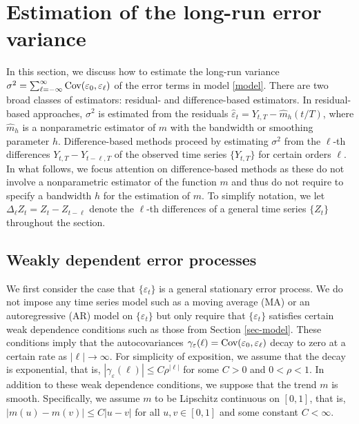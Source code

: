 \section{Estimation of the long-run error variance}\label{sec-error-var}


In this section, we discuss how to estimate the long-run variance $\sigma^2 = \sum\nolimits_{\ell=-\infty}^{\infty} \textnormal{Cov}(\varepsilon_0,\varepsilon_{\ell})$ of the error terms in model \eqref{model}. There are two broad classes of estimators: residual- and difference-based estimators. In residual-based approaches, $\sigma^2$ is estimated from the residuals $\widehat{\varepsilon}_t = Y_{t,T} - \widehat{m}_h(t/T)$, where $\widehat{m}_h$ is a nonparametric estimator of $m$ with the bandwidth or smoothing parameter $h$. Difference-based methods proceed by estimating $\sigma^2$ from the $\ell$-th differences $Y_{t,T} - Y_{t-\ell,T}$ of the observed time series $\{Y_{t,T}\}$ for certain orders $\ell$. In what follows, we focus attention on difference-based methods as these do not involve a nonparametric estimator of the function $m$ and thus do not require to specify a bandwidth $h$ for the estimation of $m$. To simplify notation, we let $\Delta_\ell Z_t = Z_t - Z_{t-\ell}$ denote the $\ell$-th differences of a general time series $\{Z_t\}$ throughout the section. 


\subsection{Weakly dependent error processes}


We first consider the case that $\{ \varepsilon_t \}$ is a general stationary error process. We do not impose any time series model such as a moving average (MA) or an autoregressive (AR) model on $\{\varepsilon_t\}$ but only require that $\{\varepsilon_t\}$ satisfies certain weak dependence conditions such as those from Section \ref{sec-model}. These conditions imply that the autocovariances $\gamma_\varepsilon(\ell) = \textnormal{Cov}(\varepsilon_0,\varepsilon_{\ell})$ decay to zero at a certain rate as $|\ell| \rightarrow \infty$. For simplicity of exposition, we assume that the decay is exponential, that is, $|\gamma_\varepsilon(\ell)| \le C \rho^{|\ell|}$ for some $C > 0$ and $0 < \rho < 1$. In addition to these weak dependence conditions, we suppose that the trend $m$ is smooth. Specifically, we assume $m$ to be Lipschitz continuous on $[0,1]$, that is, $|m(u) - m(v)| \le C|u-v|$ for all $u,v \in [0,1]$ and some constant $C < \infty$. 


